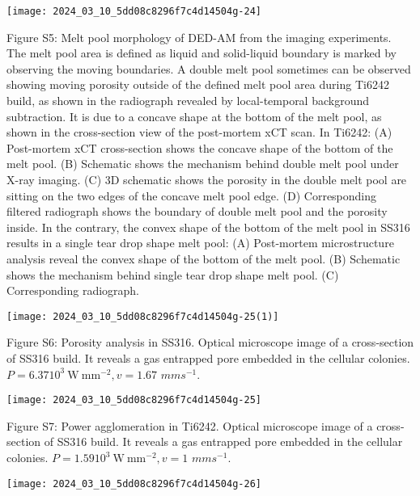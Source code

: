 \documentclass[10pt]{article}
\begin{document}
\begin{center}
\texttt{[image: 2024\_03\_10\_5dd08c8296f7c4d14504g-24]}
\end{center}

Figure S5: Melt pool morphology of DED-AM from the imaging experiments. The melt pool area is defined as liquid and solid-liquid boundary is marked by observing the moving boundaries. A double melt pool sometimes can be observed showing moving porosity outside of the defined melt pool area during Ti6242 build, as shown in the radiograph revealed by local-temporal background subtraction. It is due to a concave shape at the bottom of the melt pool, as shown in the cross-section view of the post-mortem xCT scan. In Ti6242: (A) Post-mortem xCT cross-section shows the concave shape of the bottom of the melt pool. (B) Schematic shows the mechanism behind double melt pool under X-ray imaging. (C) 3D schematic shows the porosity in the double melt pool are sitting on the two edges of the concave melt pool edge. (D) Corresponding filtered radiograph shows the boundary of double melt pool and the porosity inside. In the contrary, the convex shape of the bottom of the melt pool in SS316 results in a single tear drop shape melt pool: (A) Post-mortem microstructure analysis reveal the convex shape of the bottom of the melt pool. (B) Schematic shows the mechanism behind single tear drop shape melt pool. (C) Corresponding radiograph.

\begin{center}
\texttt{[image: 2024\_03\_10\_5dd08c8296f7c4d14504g-25(1)]}
\end{center}

Figure S6: Porosity analysis in SS316. Optical microscope image of a cross-section of SS316 build. It reveals a gas entrapped pore embedded in the cellular colonies. $P=6.3710^{3} \mathrm{~W} \mathrm{~mm}^{-2}, v=1.67$ $m m s^{-1}$.

\begin{center}
\texttt{[image: 2024\_03\_10\_5dd08c8296f7c4d14504g-25]}
\end{center}

Figure S7: Power agglomeration in Ti6242. Optical microscope image of a cross-section of SS316 build. It reveals a gas entrapped pore embedded in the cellular colonies. $P=1.5910^{3} \mathrm{~W} \mathrm{~mm}^{-2}, v=1$ $m m s^{-1}$.

\begin{center}
\texttt{[image: 2024\_03\_10\_5dd08c8296f7c4d14504g-26]}
\end{center}
\end{document}
